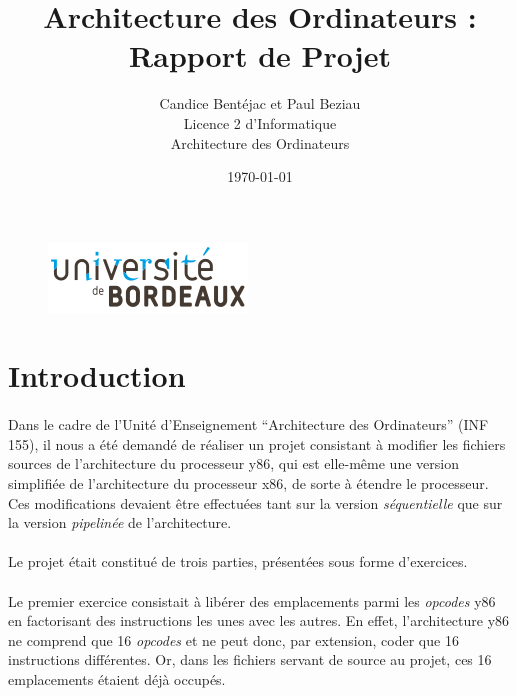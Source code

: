 \documentclass[12pt]{article}
\title{Architecture des Ordinateurs : Rapport de Projet}
\author{Candice Bentéjac et Paul Beziau\\
  Licence 2 d'Informatique\\ 
  Architecture des Ordinateurs}
\date{\today}
\begin{document}
\begin{figure}
  \includegraphics{logo_ub.png}
\end{figure}
\maketitle

\vspace{5\baselineskip}

\newpage

\tableofcontents
\newpage

\section*{Introduction}
\paragraph{}Dans le cadre de l'Unité d'Enseignement ``Architecture des Ordinateurs'' (INF 155), il nous a été demandé de réaliser un projet consistant à modifier les fichiers sources de l'architecture du processeur y86, qui est elle-même une version simplifiée de l'architecture du processeur x86, de sorte à étendre le processeur. Ces modifications devaient être effectuées tant sur la version {\itshape séquentielle} que sur la version {\itshape pipelinée} de l'architecture.

\paragraph{}Le projet était constitué de trois parties, présentées sous forme d'exercices.

\paragraph{}Le premier exercice consistait à libérer des emplacements parmi les {\itshape opcodes} y86 en factorisant des instructions les unes avec les autres. En effet, l'architecture y86 ne comprend que 16 {\itshape opcodes} et ne peut donc, par extension, coder que 16 instructions différentes. Or, dans les fichiers servant de source au projet, ces 16 emplacements étaient déjà occupés.
\end{document}
